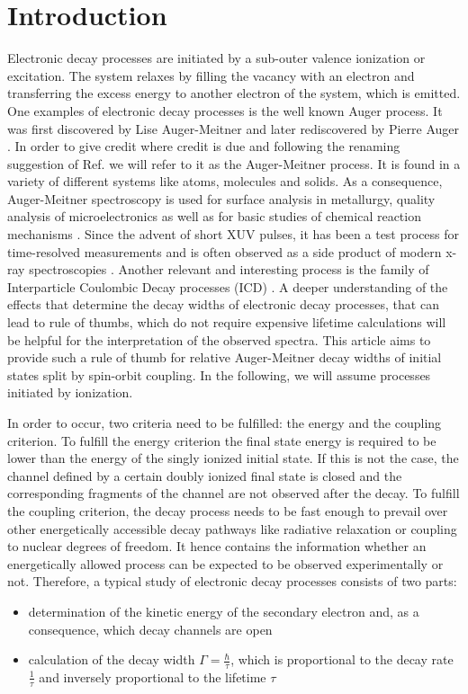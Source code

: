 \documentclass[aps,amssymb,preprint,a4paper,longbibliography]{revtex4}
\begin{document}
\section{Introduction}
Electronic decay processes are initiated by a sub-outer valence ionization
or excitation. The system relaxes by filling the vacancy with an electron and
transferring the excess energy to another electron of the system, which is emitted.
One examples of electronic decay processes is the
well known Auger process. It was first discovered
by Lise Auger-Meitner \cite{Meitner22} and later rediscovered
by Pierre Auger \cite{Auger23}. In order to give credit where credit is due
{and following the renaming suggestion of Ref. \cite{renameAuger19}
we will refer to it as the Auger-Meitner process.}
It is found in a variety of different systems like atoms, molecules and solids.
As a consequence, Auger-Meitner spectroscopy
is used for surface analysis in metallurgy,
quality analysis of microelectronics
as well as for basic studies of chemical reaction mechanisms \cite{AES_Seah_86}.
Since the advent of short XUV pulses, it has been a test process for
time-resolved measurements
{\cite{Drescher02,Smirnova03}}
and is often observed as a side product of modern x-ray spectroscopies
\cite{Greczynski20}.
Another relevant and interesting process is the family of Interparticle
Coulombic Decay processes (ICD) \cite{Cederbaum97,Hergenhahn11,Jahnke15}.
A deeper understanding of the effects that determine the decay widths
of electronic decay processes, that
can lead to rule of thumbs, which do not require expensive lifetime
calculations will
be helpful for the interpretation of the observed spectra.
This article aims to provide such a rule of thumb for relative
{Auger-Meitner}
decay widths
of initial states split by spin-orbit coupling.
In the following, we will assume processes initiated by ionization.

In order to occur, two criteria need to be fulfilled: the energy and the coupling
criterion.
To fulfill the energy criterion the final state energy is required
to be lower than
the energy of the singly ionized initial state. If this is not the case, the
channel defined by a certain doubly ionized final state
is closed and the corresponding fragments of the
channel are not observed after the decay.
To fulfill the coupling criterion, the decay process needs to be fast enough
to prevail over other energetically accessible decay pathways like radiative
relaxation or coupling to nuclear degrees of freedom.
It hence contains
the information whether an energetically allowed process can be expected
to be observed experimentally or not.
Therefore, a typical study of electronic decay processes consists of two parts:
\begin{itemize}
 \item determination of the kinetic energy of the secondary electron
       and, as a consequence, which decay channels are open
 \item calculation of the decay width $\Gamma=\frac{\hbar}{\tau}$, which
       is proportional to the decay rate $\frac{1}{\tau}$ and
       inversely proportional to the lifetime $\tau$
\end{itemize}
\end{document}
